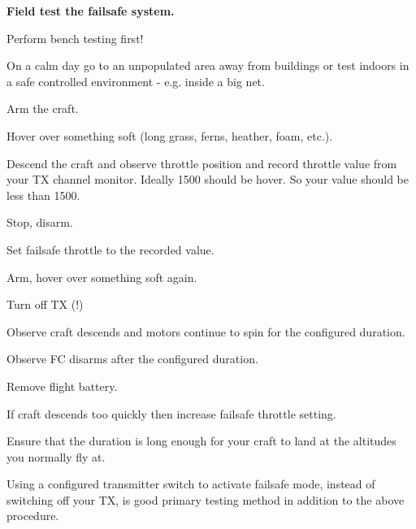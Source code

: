 {\bfseries Field test the failsafe system.}


\begin{DoxyEnumerate}
\item Perform bench testing first!
\end{DoxyEnumerate}
\begin{DoxyEnumerate}
\item On a calm day go to an unpopulated area away from buildings or test indoors in a safe controlled environment -\/ e.\+g. inside a big net.
\end{DoxyEnumerate}
\begin{DoxyEnumerate}
\item Arm the craft.
\end{DoxyEnumerate}
\begin{DoxyEnumerate}
\item Hover over something soft (long grass, ferns, heather, foam, etc.).
\end{DoxyEnumerate}
\begin{DoxyEnumerate}
\item Descend the craft and observe throttle position and record throttle value from your T\+X channel monitor. Ideally 1500 should be hover. So your value should be less than 1500.
\end{DoxyEnumerate}
\begin{DoxyEnumerate}
\item Stop, disarm.
\end{DoxyEnumerate}
\begin{DoxyEnumerate}
\item Set failsafe throttle to the recorded value.
\end{DoxyEnumerate}
\begin{DoxyEnumerate}
\item Arm, hover over something soft again.
\end{DoxyEnumerate}
\begin{DoxyEnumerate}
\item Turn off T\+X (!)
\end{DoxyEnumerate}
\begin{DoxyEnumerate}
\item Observe craft descends and motors continue to spin for the configured duration.
\end{DoxyEnumerate}
\begin{DoxyEnumerate}
\item Observe F\+C disarms after the configured duration.
\end{DoxyEnumerate}
\begin{DoxyEnumerate}
\item Remove flight battery.
\end{DoxyEnumerate}

If craft descends too quickly then increase failsafe throttle setting.

Ensure that the duration is long enough for your craft to land at the altitudes you normally fly at.

Using a configured transmitter switch to activate failsafe mode, instead of switching off your T\+X, is good primary testing method in addition to the above procedure. 